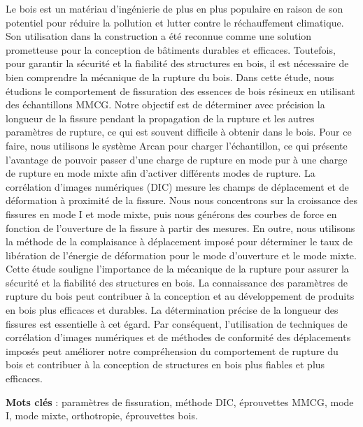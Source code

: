 \documentclass[
11pt, %
oneside, %
english, %
singlespacing, %
parskip, %
headsepline, %
chapterinoneline, %
]{MastersDoctoralThesis} %
\begin{document}
\begin{extraAbstract}

Le bois est un matériau d'ingénierie de plus en plus populaire en raison de son potentiel pour réduire la pollution et lutter contre le réchauffement climatique. Son utilisation dans la construction a été reconnue comme une solution prometteuse pour la conception de bâtiments durables et efficaces. Toutefois, pour garantir la sécurité et la fiabilité des structures en bois, il est nécessaire de bien comprendre la mécanique de la rupture du bois.
Dans cette étude, nous étudions le comportement de fissuration des essences de bois résineux en utilisant des échantillons MMCG. Notre objectif est de déterminer avec précision la longueur de la fissure pendant la propagation de la rupture et les autres paramètres de rupture, ce qui est souvent difficile à obtenir dans le bois. Pour ce faire, nous utilisons le système Arcan pour charger l'échantillon, ce qui présente l'avantage de pouvoir passer d'une charge de rupture en mode pur à une charge de rupture en mode mixte afin d'activer différents modes de rupture. La corrélation d'images numériques (DIC) mesure les champs de déplacement et de déformation à proximité de la fissure.
Nous nous concentrons sur la croissance des fissures en mode I et mode mixte, puis nous générons des courbes de force en fonction de l'ouverture de la fissure à partir des mesures. En outre, nous utilisons la méthode de la complaisance à déplacement imposé pour déterminer le taux de libération de l'énergie de déformation pour le mode d'ouverture et le mode mixte.
Cette étude souligne l'importance de la mécanique de la rupture pour assurer la sécurité et la fiabilité des structures en bois. La connaissance des paramètres de rupture du bois peut contribuer à la conception et au développement de produits en bois plus efficaces et durables. La détermination précise de la longueur des fissures est essentielle à cet égard. Par conséquent, l'utilisation de techniques de corrélation d'images numériques et de méthodes de conformité des déplacements imposés peut améliorer notre compréhension du comportement de rupture du bois et contribuer à la conception de structures en bois plus fiables et plus efficaces.

\smallskip
\textbf{Mots clés} : paramètres de fissuration, méthode DIC, éprouvettes MMCG, mode I, mode mixte, orthotropie, éprouvettes bois.

\end{extraAbstract}
\end{document}
